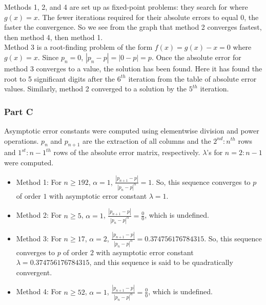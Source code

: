 \documentclass[11pt, oneside]{article}   	%
\begin{document}
Methods 1, 2, and 4 are set up as fixed-point problems: they search for where $g(x) = x$. The fewer iterations required for their absolute errors to equal 0, the faster the convergence. So we see from the graph that method 2 converges fastest, then method 4, then method 1.
\\
Method 3 is a root-finding problem of the form $f(x) = g(x) - x = 0$ where $g(x) = x$. Since $p_n = 0$, $|p_n - p| = | 0 - p | = p$. Once the absolute error for method 3 converges to a value, the solution has been found. Here it has found the root to 5 significant digits after the $6^{th}$ iteration from the table of absolute error values. Similarly, method 2 converged to a solution by the $5^{th}$ iteration.

\subsubsection*{Part C}

Asymptotic error constants were computed using elementwise division and power operations. $p_{n}$ and $p_{n+1}$ are the extraction of all columns and the $2^{nd} : n^{th}$ rows and $1^{st} : n-1^{th}$ rows of the absolute error matrix, respectively. $\lambda$'s for $n = 2:n-1$ were computed.

\begin{itemize}

\item Method 1: For $n \ge 192$, $\alpha = 1$, $\frac{|p_{n+1} - p|}{{|p_n - p|}^\alpha} = 1$. So, this sequence converges to $p$ of order $1$ with asymptotic error constant $\lambda = 1$.

\item Method 2: For $n \ge 5$, $\alpha = 1$, $\frac{|p_{n+1} - p|}{{|p_n - p|}^\alpha} = \frac{0}{0}$, which is undefined.

\item Method 3: For $n \ge 17$, $\alpha = 2$, $\frac{|p_{n+1} - p|}{{|p_n - p|}^\alpha} = 0.374756176784315$. So, this sequence converges to $p$ of order $2$ with asymptotic error constant $\lambda = 0.374756176784315$, and this sequence is said to be quadratically convergent.

\item Method 4: For $n \ge 52$, $\alpha = 1$, $\frac{|p_{n+1} - p|}{{|p_n - p|}^\alpha} = \frac{0}{0}$, which is undefined.

\end{itemize}
\end{document}
